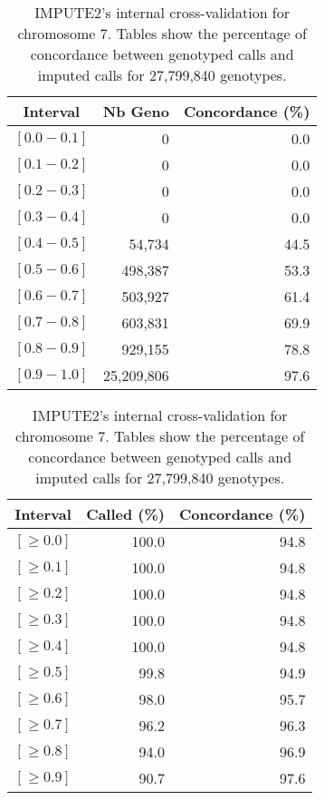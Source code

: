 \documentclass[10pt,twoside,english]{scrartcl}
\begin{document}
\begin{table}[H]
\protect\caption{IMPUTE2's internal cross-validation for chromosome 7. Tables show the
percentage of concordance between genotyped calls and imputed calls
for 27,799,840 genotypes.\label{tab:cross_validation_chr_7}}

\centering

\begin{tabular}{crr}
\hline 
\multicolumn{1}{c}{\textbf{Interval}}
 & \multicolumn{1}{c}{\textbf{Nb Geno}}
 & \multicolumn{1}{c}{\textbf{Concordance (\%)}}
\\
\hline 

$[0.0-0.1]$ & 0 & 0.0\\
$[0.1-0.2]$ & 0 & 0.0\\
$[0.2-0.3]$ & 0 & 0.0\\
$[0.3-0.4]$ & 0 & 0.0\\
$[0.4-0.5]$ & 54,734 & 44.5\\
$[0.5-0.6]$ & 498,387 & 53.3\\
$[0.6-0.7]$ & 503,927 & 61.4\\
$[0.7-0.8]$ & 603,831 & 69.9\\
$[0.8-0.9]$ & 929,155 & 78.8\\
$[0.9-1.0]$ & 25,209,806 & 97.6\\
\hline 
\end{tabular}
\hfill
\begin{tabular}{crr}
\hline 
\multicolumn{1}{c}{\textbf{Interval}}
 & \multicolumn{1}{c}{\textbf{Called (\%)}}
 & \multicolumn{1}{c}{\textbf{Concordance (\%)}}
\\
\hline 

$[\geq 0.0]$ & 100.0 & 94.8\\
$[\geq 0.1]$ & 100.0 & 94.8\\
$[\geq 0.2]$ & 100.0 & 94.8\\
$[\geq 0.3]$ & 100.0 & 94.8\\
$[\geq 0.4]$ & 100.0 & 94.8\\
$[\geq 0.5]$ & 99.8 & 94.9\\
$[\geq 0.6]$ & 98.0 & 95.7\\
$[\geq 0.7]$ & 96.2 & 96.3\\
$[\geq 0.8]$ & 94.0 & 96.9\\
$[\geq 0.9]$ & 90.7 & 97.6\\
\hline 
\end{tabular}


\end{table}
\end{document}
